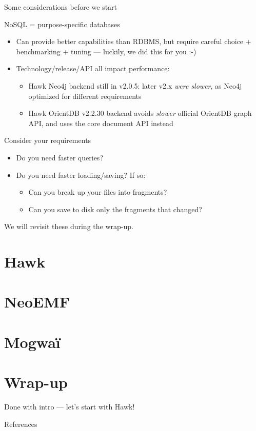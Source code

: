 \documentclass[10pt]{beamer}
\begin{document}
\begin{frame}{Some considerations before we start}

  \begin{block}{NoSQL = purpose-specific databases}
    \begin{itemize}
    \item Can provide better capabilities than RDBMS, but require careful choice
      + benchmarking + tuning --- luckily, we did this for you :-)
    \item Technology/release/API all impact performance:
      \begin{itemize}
      \item Hawk Neo4j backend still in v2.0.5: later v2.x \emph{were slower},
        as Neo4j optimized for different requirements
      \item Hawk OrientDB v2.2.30 backend avoids \emph{slower} official OrientDB
        graph API, and uses the core document API instead
      \end{itemize}
    \end{itemize}
  \end{block}

  \begin{block}{Consider your requirements}
    \begin{itemize}
    \item Do you need faster queries?
    \item Do you need faster loading/saving? If so:
      \begin{itemize}
      \item Can you break up your files into fragments?
      \item Can you save to disk only the fragments that changed?
      \end{itemize}
    \end{itemize}

    We will revisit these during the wrap-up.
  \end{block}

\end{frame}


\section{Hawk}

\section{NeoEMF}

\section{Mogwa\"i}

\section{Wrap-up}

\appendix

\begin{frame}[standout]
  Done with intro --- let's start with Hawk!
\end{frame}

\begin{frame}{References}

  
  

\end{frame}
\end{document}
